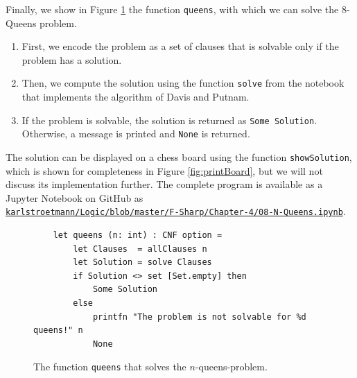 Finally, we show in Figure \ref{fig:solve:queens} the function
\texttt{queens}, with which we can solve the 8-Queens problem.
\begin{enumerate}
\item First, we encode the problem as a set of clauses that is solvable
      only if the problem has a solution.
\item Then, we compute the solution using the function \texttt{solve} from the notebook
      that implements the algorithm of Davis and Putnam.
\item If the problem is solvable, the solution is returned as \texttt{Some Solution}.  Otherwise, a message is
      printed and \texttt{None} is returned.
\end{enumerate}
The solution can be displayed on a chess board using the function \texttt{showSolution}, which is shown for
completeness in Figure \ref{fig:printBoard}, but we will not discuss its implementation further.
The complete program is available as a Jupyter Notebook on GitHub as
\\[0.2cm]
\hspace*{0.0cm}
\href{https://github.com/karlstroetmann/Logic/blob/master/F-Sharp/Chapter-4/08-N-Queens.ipynb}{\texttt{karlstroetmann/Logic/blob/master/F-Sharp/Chapter-4/08-N-Queens.ipynb}}.




\begin{figure}[!ht]
\centering
\begin{verbatim}
    let queens (n: int) : CNF option =
        let Clauses  = allClauses n
        let Solution = solve Clauses
        if Solution <> set [Set.empty] then
            Some Solution
        else
            printfn "The problem is not solvable for %d queens!" n
            None
\end{verbatim}
\vspace*{-0.3cm}
\caption{The function \texttt{queens} that solves the $n$-queens-problem.}
\label{fig:solve:queens}
\end{figure}


